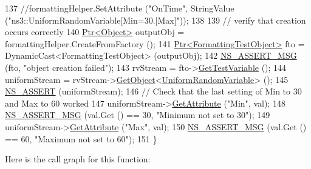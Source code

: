 \begin{DoxyCode}
137   \textcolor{comment}{//formattingHelper.SetAttribute ("OnTime", StringValue ("ns3::UniformRandomVariable[Min=30.|Max]"));}
138 
139   \textcolor{comment}{// verify that creation occurs correctly}
140   \hyperlink{classns3_1_1Ptr}{Ptr<Object>} outputObj = formattingHelper.CreateFromFactory ();
141   \hyperlink{classns3_1_1Ptr}{Ptr<FormattingTestObject>} fto = DynamicCast<FormattingTestObject> (outputObj);
142   \hyperlink{assert_8h_aff5ece9066c74e681e74999856f08539}{NS\_ASSERT\_MSG} (fto, \textcolor{stringliteral}{"object creation failed"});
143   rvStream = fto->\hyperlink{classFormattingTestObject_a28e10307ede8d8c9b118ab0d3b83739b}{GetTestVariable} ();
144   uniformStream = rvStream->\hyperlink{classns3_1_1Object_a13e18c00017096c8381eb651d5bd0783}{GetObject}<\hyperlink{classns3_1_1UniformRandomVariable}{UniformRandomVariable}> ();
145   \hyperlink{assert_8h_a6dccdb0de9b252f60088ce281c49d052}{NS\_ASSERT} (uniformStream);
146   \textcolor{comment}{// Check that the last setting of Min to 30 and Max to 60 worked}
147   uniformStream->\hyperlink{classns3_1_1ObjectBase_a895d1de2f96063d0e0fd78463e7a7e30}{GetAttribute} (\textcolor{stringliteral}{"Min"}, val);
148   \hyperlink{assert_8h_aff5ece9066c74e681e74999856f08539}{NS\_ASSERT\_MSG} (val.Get () == 30, \textcolor{stringliteral}{"Minimum not set to 30"});
149   uniformStream->\hyperlink{classns3_1_1ObjectBase_a895d1de2f96063d0e0fd78463e7a7e30}{GetAttribute} (\textcolor{stringliteral}{"Max"}, val);
150   \hyperlink{assert_8h_aff5ece9066c74e681e74999856f08539}{NS\_ASSERT\_MSG} (val.Get () == 60, \textcolor{stringliteral}{"Maximum not set to 60"});
151 \}
\end{DoxyCode}


Here is the call graph for this function\+:


